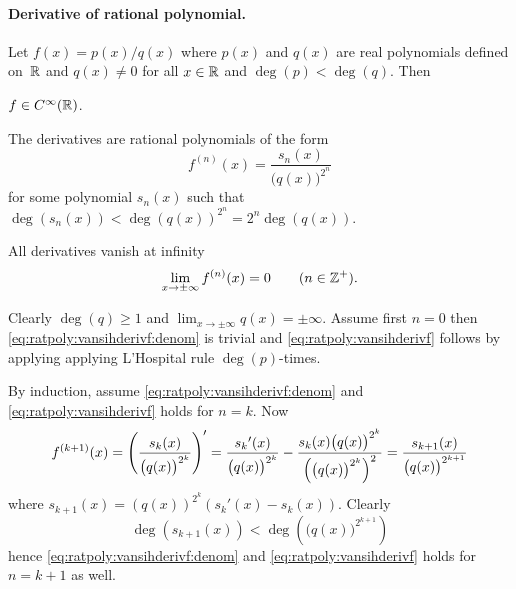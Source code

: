 \paragraph{Derivative of rational polynomial.}

\begin{llem} \label{lem:ratpoly:vansihderivf}
Let \(f(x) = p(x)/q(x)\) where \(p(x)\) and \(q(x)\) are 
real polynomials defined on~\(\mathbb{R}\) and \(q(x)\neq 0\) for all \(x\in\mathbb{R}\)
and \(\deg(p) < \deg(q)\).
Then 
\begin{itemize}
 \(f\in C^\infty(\mathbb{R})\).

 The derivatives are rational polynomials of the form
\begin{equation} \label{eq:ratpoly:vansihderivf:denom}
f^{(n)}(x) = \frac{s_n(x)}{\bigl(q(x)\bigr)^{2^n}}
\end{equation}
for some polynomial \(s_n(x)\) such that 
\(\deg(s_n(x)) < \deg(q(x))^{2^n} = 2^n\deg(q(x))\).


 All derivatives vanish at infinity
\begin{equation} \label{eq:ratpoly:vansihderivf}
\lim_{x\to\pm\infty} f^{(n)}(x) = 0 \qquad (n \in\mathbb{Z}^+).
\end{equation}

\end{itemize}
\end{llem}
\begin{thmproof}
Clearly \(\deg(q) \geq 1\) and \(\lim_{x\to\pm\infty}q(x) = \pm\infty\).
Assume first \(n=0\) 
then \eqref{eq:ratpoly:vansihderivf:denom} is trivial 
and \eqref{eq:ratpoly:vansihderivf}
follows by applying applying L'Hospital rule \(\deg(p)\)-times.

By induction, 
assume \eqref{eq:ratpoly:vansihderivf:denom} 
and \eqref{eq:ratpoly:vansihderivf} holds for \(n=k\).
Now
\begin{equation*}
f^{(k+1)}(x) 
= \left(\frac{s_k(x)}{\bigl(q(x)\bigr)^{2^k}}\right)'
=   \frac{{s_k}'(x)}{\bigl(q(x)\bigr)^{2^k}} 
  - \frac{{s_k}(x) \bigl(q(x)\bigr)^{2^k}}{%
          \left(\bigl(q(x)\bigr)^{2^k}\right)^2} 
= \frac{s_{k+1}(x)}{\bigl(q(x)\bigr)^{2^{k+1}}}
\end{equation*}
where \(s_{k+1}(x) = (q(x))^{2^k}({s_k}'(x) - s_k(x))\).
Clearly
\begin{equation*}
\deg(s_{k+1}(x)) < \deg\left(\bigl(q(x)\bigr)^{2^{k+1}}\right)
\end{equation*}
hence \eqref{eq:ratpoly:vansihderivf:denom} 
and \eqref{eq:ratpoly:vansihderivf} holds for \(n=k+1\) as well.
\end{thmproof}

